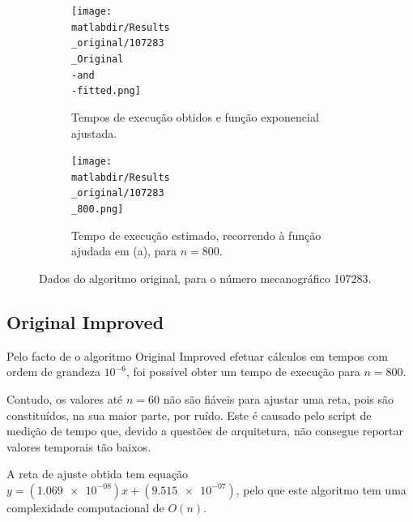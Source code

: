 \documentclass[portuguese,11pt,a4paper,titlepage]{article}
\newcommand{\matlabdir}{"../MATLAB-fittings"}
\begin{document}
\begin{figure}[h]
	\begin{subfigure}{0.47\textwidth}
	\texttt{[image: \\matlabdir/Results\\\_original/107283\\\_Original\\-and\\-fitted.png]} 
	\caption{Tempos de execução obtidos e função exponencial ajustada.}
	\label{fig:original_107283_plot}
	\end{subfigure}
	\hspace{0.049\textwidth}
	\begin{subfigure}{0.47\textwidth}
	\texttt{[image: \\matlabdir/Results\\\_original/107283\\\_800.png]}
	\caption{Tempo de execução estimado, recorrendo à função ajudada em (a), para \begin{math}n=800\end{math}.}
	\label{fig:original_107283_800}
	\end{subfigure}
	
	\caption{Dados do algoritmo original, para o número mecanográfico 107283.}
	\label{fig:original_107283}
\end{figure}

\subsection{Original Improved}
Pelo facto de o algoritmo Original Improved efetuar cálculos em tempos com ordem de grandeza
\begin{math}10^{-6}\end{math}, foi possível obter um tempo de execução para \begin{math}n = 800\end{math}.

Contudo, os valores até \begin{math}n = 60\end{math} não são fiáveis para ajustar uma reta,
pois são constituídos, na sua maior parte, por ruído.
Este é causado pelo script de medição de tempo que, devido a questões de arquitetura,
não consegue reportar valores temporais tão baixos.

A reta de ajuste obtida tem equação \begin{math}y=(\num{1.069e-08})x+(\num{9.515e-07})\end{math},
pelo que este algoritmo tem uma complexidade computacional de \begin{math}O(n)\end{math}.
\end{document}
